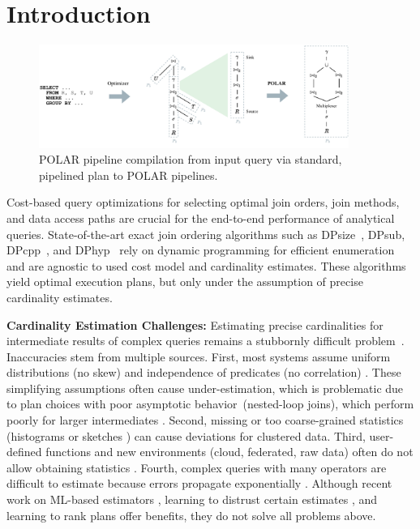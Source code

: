 \section{Introduction}

\begin{figure}[t]
    \centering
    \includegraphics[width=0.9\textwidth]{figures/polar_pipeline-4.pdf}
		\vspace{-0.5cm}
		\caption{POLAR pipeline compilation from input query via standard, pipelined plan to POLAR pipelines.}
    \label{fig:pipeline_design}
		\vspace{-0.1cm}
\end{figure}

Cost-based query optimizations \cite{SelingerACLP79,moerkotte23} for selecting optimal join orders, join methods, and data access paths are crucial for the end-to-end performance of analytical queries. State-of-the-art exact join ordering algorithms such as DPsize~\cite{SelingerACLP79,HanKLLM08}, DPsub, DPcpp~\cite{MoerkotteN06}, and DPhyp~\cite{MoerkotteN08} rely on dynamic programming for efficient enumeration and are agnostic to used cost model and cardinality estimates. These algorithms yield optimal execution plans, but only under the assumption of precise cardinality estimates. 

\textbf{Cardinality Estimation Challenges:} Estimating precise cardinalities for intermediate results of complex queries remains a stubbornly difficult problem~\cite{LeisGMBK015}. Inaccuracies stem from multiple sources. First, most systems assume uniform distributions (no skew) and independence of predicates (no correlation) \cite{IlyasMHBA04}. These simplifying assumptions often cause under-estimation, which is problematic due to plan choices with poor asymptotic behavior~(\eg nested-loop joins), which perform poorly for larger intermediates \cite{IlyasMHBA04,LeisGMBK015}. Second, missing or too coarse-grained statistics (\eg histograms \cite{KanneM10} or sketches \cite{IzenovDRS21}) can cause deviations for clustered data. Third, user-defined functions and new environments (\eg cloud, federated, raw data) often do not allow obtaining statistics \cite{HueskePSRBKT12,JosifovskiSHL02,ReyFN23}. Fourth, complex queries with many operators are difficult to estimate because errors propagate exponentially \cite{IzenovDRS21,IoannidisC91,MoerkotteNS09}. Although recent work on ML-based estimators \cite{KipfKRLBK19,DuttWNKNC19,YangLKWDCAHKS19}, learning to distrust certain estimates \cite{MarcusNMZAKPT19}, and learning to rank plans \cite{BehrMK23} offer benefits, they do not solve all problems above.

